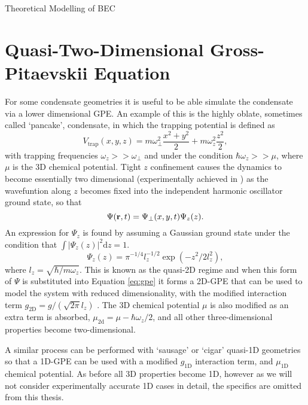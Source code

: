 \begin{chapter}{\label{cha:theoretical_model}Theoretical Modelling of BEC}
\section{\label{section:quasi2dgpe} Quasi-Two-Dimensional Gross-Pitaevskii Equation}
	For some condensate geometries it is useful to be able simulate the condensate via a lower dimensional GPE. An example of this is the highly oblate, sometimes called `pancake', condensate, in which the trapping potential is defined as
	\begin{equation}
		V_{\mathrm{trap}}(x,y,z)=m\omega_\perp^2\frac{x^2+y^2}{2} + m\omega_z^2\frac{z^2}{2},
	\end{equation}
	with trapping frequencies $\omega_z >> \omega_\perp$ and under the condition $\hbar\omega_z >> \mu$, where $\mu$ is the 3D chemical potential. Tight $z$ confinement causes the dynamics to become essentially two dimensional (experimentally achieved in \cite{Gorlitz}) as the wavefuntion along $z$ becomes fixed into the independent harmonic oscillator ground state, so that
	\begin{equation}
		\Psi({\bf r},t) = \Psi_\perp(x,y,t) \Psi_z(z).
	\end{equation}
	An expression for $\Psi_z$ is found by assuming a Gaussian ground state under the condition that $\int |\Psi_z(z)|^2 \mathrm{d}z=1$.
	\begin{equation}
		\Psi_z(z) = \pi^{-1/4} l_z^{-1/2} \exp\left(-z^2/2l_z^2\right),
	\end{equation}
  where $l_z=\sqrt{\hbar/m \omega_z}$. This is known as the quasi-2D regime and when this form of $\Psi$ is substituted into Equation \ref{eq:gpe} it forms a 2D-GPE that can be used to model the system with reduced dimensionality, with the modified interaction term $g_{\mathrm{2D}} = g/( \sqrt{2\pi}l_z)$ \cite{parkerthesis}. The 3D chemical potential $\mu$ is also modified as an extra term is absorbed, $\mu_\mathrm{2d} = \mu - \hbar\omega_z/2$, and all other three-dimensional properties become two-dimensional.

	A similar process can be performed with `sausage' or `cigar' quasi-1D geometries so that a 1D-GPE can be used with a modified $g_{\mathrm{1D}}$ interaction term, and $\mu_{\mathrm{1D}}$ chemical potential. As before all 3D properties become 1D, however as we will not consider experimentally accurate 1D cases in detail, the specifics are omitted from this thesis.



\end{chapter}
